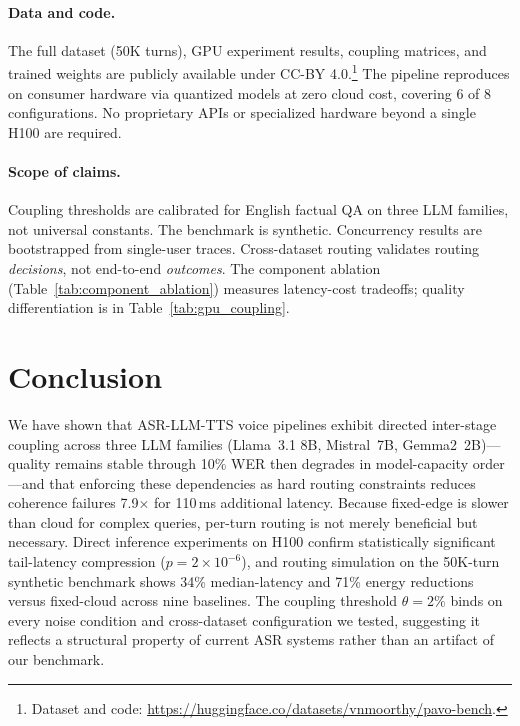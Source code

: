 \documentclass{article}
\begin{document}
\paragraph{Data and code.}
The full dataset (50K turns), GPU experiment results, coupling matrices, and trained weights are publicly available under CC-BY 4.0.\footnote{Dataset and code: \url{https://huggingface.co/datasets/vnmoorthy/pavo-bench}.} The pipeline reproduces on consumer hardware via quantized models at zero cloud cost, covering 6 of 8 configurations. No proprietary APIs or specialized hardware beyond a single H100 are required.

\paragraph{Scope of claims.}
Coupling thresholds are calibrated for English factual QA on three LLM families, not universal constants. The benchmark is synthetic. Concurrency results are bootstrapped from single-user traces. Cross-dataset routing validates routing \emph{decisions}, not end-to-end \emph{outcomes}. The component ablation (Table~\ref{tab:component_ablation}) measures latency-cost tradeoffs; quality differentiation is in Table~\ref{tab:gpu_coupling}.

\section{Conclusion}
\label{sec:conclusion}

We have shown that ASR-LLM-TTS voice pipelines exhibit directed inter-stage coupling across three LLM families (Llama~3.1 8B, Mistral~7B, Gemma2~2B)---quality remains stable through 10\% WER then degrades in model-capacity order---and that enforcing these dependencies as hard routing constraints reduces coherence failures 7.9$\times$ for 110\,ms additional latency. Because fixed-edge is slower than cloud for complex queries, per-turn routing is not merely beneficial but necessary. Direct inference experiments on H100 confirm statistically significant tail-latency compression ($p = 2\times10^{-6}$), and routing simulation on the 50K-turn synthetic benchmark shows 34\% median-latency and 71\% energy reductions versus fixed-cloud across nine baselines. The coupling threshold $\theta=2\%$ binds on every noise condition and cross-dataset configuration we tested, suggesting it reflects a structural property of current ASR systems rather than an artifact of our benchmark.
\end{document}

